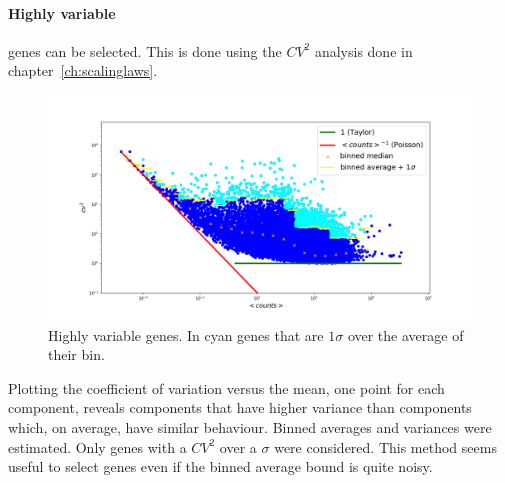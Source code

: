 \paragraph{Highly variable} genes can be selected. This is done using the $CV^2$ analysis done in chapter~\ref{ch:scalinglaws}.
\begin{figure}[htb!]
    \centering
    \includegraphics[width=0.8\linewidth]{pictures/topic/cvmean_oversigma.png}
    \caption{Highly variable genes. In \textcolor{pythoncyan}{cyan} genes that are $1 \sigma$ over the average of their bin.}
    \label{fig:topic/cvmean_oversigma}
\end{figure}
Plotting the coefficient of variation versus the mean, one point for each component, reveals components that have higher variance than components which, on average, have similar behaviour. Binned averages and variances were estimated. Only genes with a $CV^2$ over a $\sigma$ were considered. This method seems useful to select genes even if the binned average bound is quite noisy.

